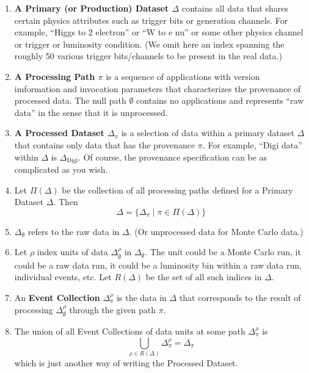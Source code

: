 \documentclass{cmspaper}
\begin{document}
\begin{enumerate}

\item {\bf A Primary (or Production) Dataset $\Delta$} 
contains all data that shares certain physics 
attributes such as trigger bits or generation channels.  For example, ``Higgs to 2 electron''
or ``W to e nu'' or some other physics channel or trigger or luminosity condition.  (We omit 
here an index spanning the roughly 50 various trigger bits/channels to be present in the 
real data.) 

\item {\bf A Processing Path $\pi$} is a sequence of applications with version imformation 
and invocation parameters that
characterizes the provenance of processed data.  The null path $\emptyset$ contains
no applications and represents ``raw data'' in the sense that it is unprocessed.  

\item {\bf A Processed Dataset $\Delta_{\pi}$} is a selection of data within a primary 
dataset $\Delta$ that contains only data that has the provenance $\pi$.  For example, 
``Digi data'' within $\Delta$ is $\Delta_{\mbox{Digi}}$.  Of course, the provenance specification 
can be as complicated as you wish.

\item Let $\Pi(\Delta)$ be the collection of all processing paths defined for a Primary 
Dataset $\Delta $.  Then 
\begin{equation}
    \Delta = \{ \Delta_{\pi} \mid \pi \in \Pi(\Delta) \}
\end{equation}

\item $\Delta_{\emptyset}$ refers to the raw data in $\Delta$. (Or unprocessed data for 
Monte Carlo data.) 

\item Let $\rho$ index units of data $\Delta_{\emptyset}^{\rho}$ 
in $\Delta_{\emptyset}$.  The unit 
could be a Monte Carlo run, it could be a raw data run, 
it could be a luminosity bin within a raw data run, 
individual events, etc.  Let $R(\Delta)$ be the 
set of all such indices in $\Delta$.

\item An {\bf Event Collection} $\Delta_{\pi}^{\rho}$ is the 
data in $\Delta$ that corresponds to the result of processing $\Delta_{\emptyset}^{\rho}$ 
through the given path $\pi$.  

\item The union
of all Event Collections of data units at some path $\Delta_{\pi}^{\rho}$ is 
\begin{equation}
\bigcup_{\rho \in R(\Delta)} \Delta_{\pi}^{\rho} = \Delta_{\pi}
\end{equation}
which is just another way of writing the Processed Dataset.  


\end{enumerate}
\end{document}
